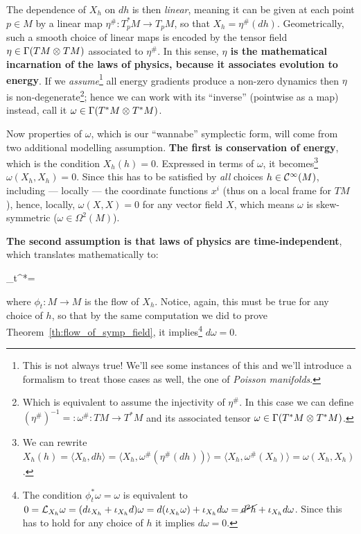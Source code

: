 \documentclass[main.tex]{subfiles}
\begin{document}
\begin{construction}
	The dependence of $X_h$ on $dh$ is then \emph{linear}, meaning it can be given at each point $p \in M$ by a linear map $\eta^\# : T^*_pM \to T_pM$, so that $X_h = \eta^\# (dh)$. Geometrically, such a smooth choice of linear maps is encoded by the tensor field $\eta \in \Gamma(TM \otimes_{} TM)$ associated to $\eta^\#$. In this sense, \textbf{$\eta$ is the mathematical incarnation of the laws of physics, because it associates evolution to energy}. If we \emph{assume}\footnote{This is not always true! We'll see some instances of this and we'll introduce a formalism to treat those cases as well, the one of \emph{Poisson manifolds}.} all energy gradients produce a non-zero dynamics then $\eta$ is non-degenerate\footnote{Which is equivalent to assume the injectivity of $\eta^\#$. In this case we can define $(\eta^\#)^{-1} =: \omega^\# : TM \to T^*M$ and its associated tensor $\omega \in \Gamma(T^*M \otimes_{} T^*M)$.}; hence we can work with its ``inverse'' (pointwise as a map) instead, call it $\omega \in \Gamma(T^*M \otimes_{} T^*M)$.

	Now properties of $\omega$, which is our ``wannabe'' symplectic form, will come from two additional modelling assumption. \textbf{The first is conservation of energy}, which is the condition $X_h(h) = 0$. Expressed in terms of $\omega$, it becomes\footnote{We can rewrite $X_h(h) = \langle X_h, dh \rangle = \langle X_h, \omega^\#(\eta^\#(dh)) \rangle = \langle X_h, \omega^\#(X_h) \rangle = \omega(X_h, X_h)$.} $\omega(X_h, X_h) = 0$. Since this has to be satisfied by \emph{all} choices $h \in \mathcal{C}^\infty(M)$, including --- locally --- the coordinate functions $x^i$ (thus on a local frame for $TM$), hence, locally, $\omega(X,X) = 0$ for any vector field $X$, which means $\omega$ is skew-symmetric ($\omega \in \Omega^2(M)$).

	\textbf{The second assumption is that laws of physics are time-independent}, which translates mathematically to:
	\begin{eqalign}
		\phi_t^*\omega = \omega
	\end{eqalign}
	where $\phi_t : M \to M$ is the flow of $X_h$. Notice, again, this must be true for any choice of $h$, so that by the same computation we did to prove Theorem~\ref{th:flow_of_symp_field}, it implies\footnote{The condition $\phi_t^*\omega = \omega$ is equivalent to $0 = \mathcal{L}_{X_h}\omega = (d\iota_{X_h} + \iota_{X_h}d)\omega = d(\iota_{X_h}\omega)+\iota_{X_h}d\omega = \cancel{d^2h} + \iota_{X_h}d\omega$. Since this has to hold for any choice of $h$ it implies $d\omega=0$.} $d\omega = 0$.
\end{construction}
\end{document}
